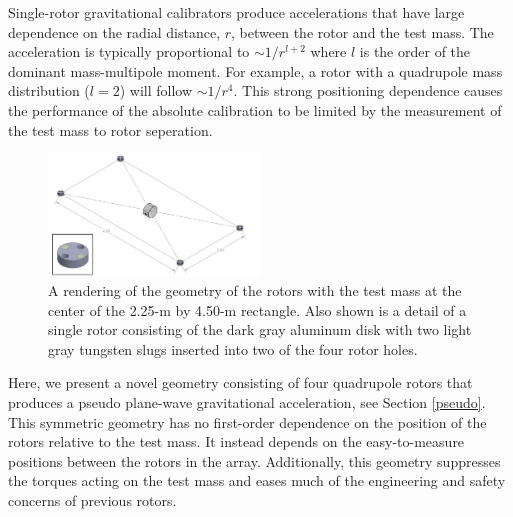\documentclass[superscriptaddress, twocolumn, prd]{revtex4-1}
\begin{document}
Single-rotor gravitational calibrators \cite{Estevez_2018, estevez2021newtonian, PhysRevD.98.022005, ncal} produce accelerations that have large dependence on the radial distance, $r$, between the rotor and the test mass. The acceleration is typically proportional to $\sim1/r^{l+2}$ where $l$ is the order of the dominant mass-multipole moment. For example, a rotor with a quadrupole mass distribution ($l=2$) will follow $\sim1/r^4$. This strong positioning dependence causes the performance of the absolute calibration to be limited by the measurement of the test mass to rotor seperation.

\begin{figure}[!h]
\centering \includegraphics[width=0.5\textwidth]{Super4_Model.pdf}
\caption{A rendering of the geometry of the rotors with the test mass at the center of the 2.25-m by 4.50-m rectangle. Also shown is a detail of a single rotor consisting of the dark gray aluminum disk with two light gray tungsten slugs inserted into two of the four rotor holes.}
\label{cad} 
\end{figure}

Here, we present a novel geometry consisting of four quadrupole rotors that produces a pseudo plane-wave gravitational acceleration, see Section \ref{pseudo}. This symmetric geometry has no first-order dependence on the position of the rotors relative to the test mass. It instead depends on the easy-to-measure positions between the rotors in the array. Additionally, this geometry suppresses the torques acting on the test mass and eases much of the engineering and safety concerns of previous rotors.
\end{document}
